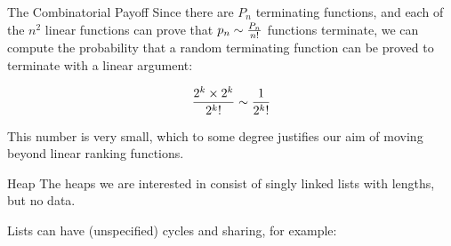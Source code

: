 \documentclass[xcolor=pdftex,t,11pt]{beamer}
\begin{document}
\begin{frame}{The Combinatorial Payoff}
Since there are $P_n$ terminating functions, and each of the $n^2$ linear functions can prove that
$p_n \sim {P_n \over n!}$ functions terminate, we can compute the probability that a random terminating
function can be proved to terminate with a linear argument:

$${2^k \times 2^k \over {2^k}!} \sim {1 \over {2^k}!}$$

\pause

\vspace{1em}

This number is very small, which to some degree justifies our aim of moving beyond linear ranking functions.

\end{frame}

\begin{frame}[fragile]{Heap}
The heaps we are interested in consist of singly linked lists with lengths, but no data.

Lists can have (unspecified) cycles and sharing, for example:

\begin{center}
\end{center}
\end{frame}
\end{document}
